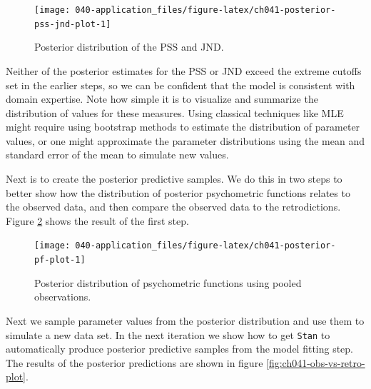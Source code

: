 \documentclass[11pt, oneside, openany]{scrbook}
\newenvironment{Shaded}{\begin{snugshade}}{\end{snugshade}}
\newcommand{\DataTypeTok}[1]{\textcolor[rgb]{0.13,0.29,0.53}{#1}}
\newcommand{\KeywordTok}[1]{\textcolor[rgb]{0.13,0.29,0.53}{\textbf{#1}}}
\newcommand{\NormalTok}[1]{#1}
\newcommand{\OperatorTok}[1]{\textcolor[rgb]{0.81,0.36,0.00}{\textbf{#1}}}
\newcommand{\OtherTok}[1]{\textcolor[rgb]{0.56,0.35,0.01}{#1}}
\newcommand{\StringTok}[1]{\textcolor[rgb]{0.31,0.60,0.02}{#1}}
\begin{document}

\begin{figure}

{\centering \texttt{[image: 040-application\_files/figure-latex/ch041-posterior-pss-jnd-plot-1]} 

}

\caption{Posterior distribution of the PSS and JND.}\label{fig:ch041-posterior-pss-jnd-plot}
\end{figure}

Neither of the posterior estimates for the PSS or JND exceed the extreme cutoffs set in the earlier steps, so we can be confident that the model is consistent with domain expertise. Note how simple it is to visualize and summarize the distribution of values for these measures. Using classical techniques like MLE might require using bootstrap methods to estimate the distribution of parameter values, or one might approximate the parameter distributions using the mean and standard error of the mean to simulate new values.

Next is to create the posterior predictive samples. We do this in two steps to better show how the distribution of posterior psychometric functions relates to the observed data, and then compare the observed data to the retrodictions. Figure \ref{fig:ch041-posterior-pf-plot} shows the result of the first step.

\begin{figure}

{\centering \texttt{[image: 040-application\_files/figure-latex/ch041-posterior-pf-plot-1]} 

}

\caption{Posterior distribution of psychometric functions using pooled observations.}\label{fig:ch041-posterior-pf-plot}
\end{figure}

Next we sample parameter values from the posterior distribution and use them to simulate a new data set. In the next iteration we show how to get \texttt{Stan} to automatically produce posterior predictive samples from the model fitting step. The results of the posterior predictions are shown in figure \ref{fig:ch041-obs-vs-retro-plot}.


\begin{Shaded}
\end{Shaded}
\end{document}
